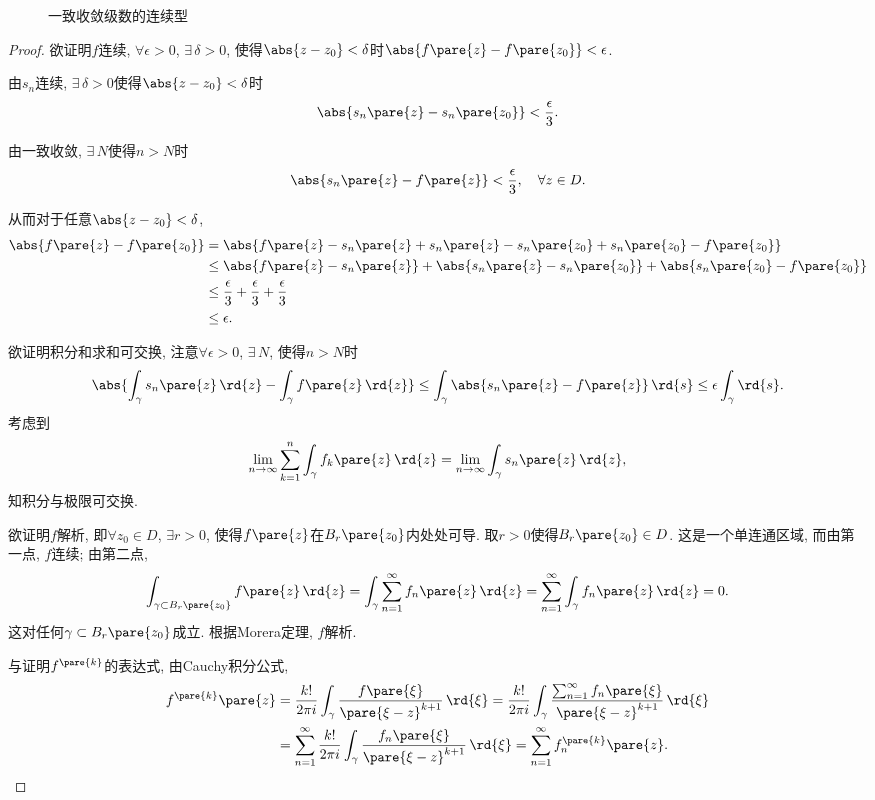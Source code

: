 \documentclass{ctexart}
\begin{document}
\begin{figure}[ht]
    \centering
    \caption{一致收敛级数的连续型}
\end{figure}
\begin{proof}
    欲证明$f$连续, $\forall \epsilon > 0$, $\exists\,\delta > 0$, 使得$\abs{z-z_0}<\delta$时$\abs{f\pare{z} - f\pare{z_0}}<\epsilon$.
    \begin{cenum}
        \item 由$s_n$连续, $\exists\, \delta>0$使得$\abs{z-z_0}<\delta$时
        \[ \abs{s_n\pare{z} - s_n\pare{z_0}} < \frac{\epsilon}{3}. \]
        \item 由一致收敛, $\exists\, N$使得$n>N$时
        \[ \abs{s_n\pare{z} - f\pare{z}} < \frac{\epsilon}{3},\quad \forall z\in D. \]
        \item 从而对于任意$\abs{z-z_0}<\delta$,
        \begin{align*}
            \abs{f\pare{z} - f\pare{z_0}} &= \abs{f\pare{z} - s_n\pare{z} + s_n\pare{z} - s_n\pare{z_0} + s_n\pare{z_0} - f\pare{z_0}} \\
            &\le \abs{f\pare{z}  -s_n\pare{z}} + \abs{s_n\pare{z} - s_n\pare{z_0}} + \abs{s_n\pare{z_0} - f\pare{z_0}} \\
            &\le \frac{\epsilon}{3} + \frac{\epsilon}{3} + \frac{\epsilon}{3} \\
            &\le \epsilon.
        \end{align*}
    \end{cenum}
    \par
    欲证明积分和求和可交换, 注意$\forall \epsilon>0$, $\exists\, N$, 使得$n>N$时 
    \[ \abs{\int_\gamma s_n\pare{z}\,\rd{z} - \int_\gamma f\pare{z}\,\rd{z}} \le \int_\gamma \abs{s_n\pare{z} - f\pare{z}}\,\rd{s} \le \epsilon \int_\gamma\rd{s}. \]
    考虑到
    \[ \lim_{n\rightarrow\infty} \sum_{k=1}^n \int_\gamma f_k\pare{z}\,\rd{z} = \lim_{n\rightarrow\infty}\int_\gamma s_n\pare{z}\,\rd{z}, \]
    知积分与极限可交换.
    \par
    欲证明$f$解析, 即$\forall z_0 \in D$, $\exists r>0$, 使得$f\pare{z}$在$B_r\pare{z_0}$内处处可导. 取$r>0$使得$B_r\pare{z_0} \in D$. 这是一个单连通区域, 而由第一点, $f$连续; 由第二点,
    \[ \int_{\gamma \subset B_r\pare{z_0}}f\pare{z}\,\rd{z} = \int_\gamma \sum_{n=1}^\infty f_n\pare{z}\,\rd{z} = \sum_{n=1}^\infty \int_\gamma f_n\pare{z}\,\rd{z} = 0. \]
    这对任何$\gamma\subset B_r\pare{z_0}$成立. 根据Morera定理, $f$解析.
    \par
    与证明$f^{\pare{k}}$的表达式, 由Cauchy积分公式,
    \begin{align*}
        f^{\pare{k}}\pare{z} &= \frac{k!}{2\pi i} \int_\gamma \frac{f\pare{\xi}}{\pare{\xi - z}^{k+1}}\,\rd{\xi} = \frac{k!}{2\pi i} \int_\gamma \frac{\sum_{n=1}^\infty f_n\pare{\xi}}{\pare{\xi - z}^{k+1}}\,\rd{\xi} \\
        &= \sum_{n=1}^\infty \frac{k!}{2\pi i} \int_\gamma \frac{f_n\pare{\xi}}{\pare{\xi - z}^{k+1}}\,\rd{\xi} = \sum_{n=1}^\infty f_n^{\pare{k}}\pare{z}. \qedhere
    \end{align*}
\end{proof}
\end{document}
